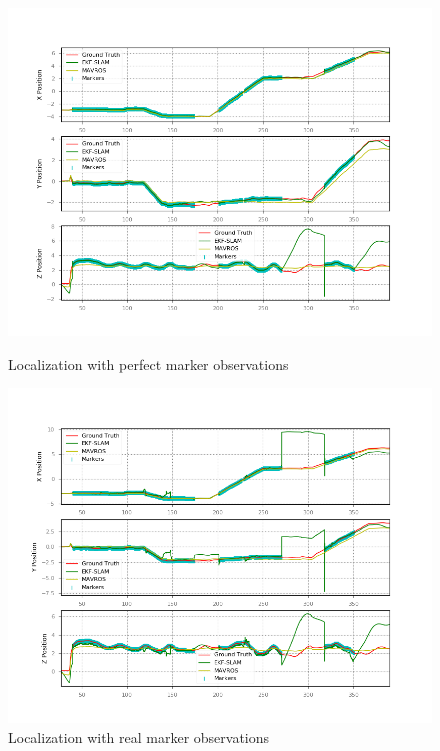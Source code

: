 \begin{figure}
    \centering
    \includegraphics[width=\textwidth]{Images/fig21-fake-markers-wmap.png}
    \caption{Localization with perfect marker observations}
    \label{fig:chapter3:simulation:b:fake-markers-real-map}
    \centering
    \includegraphics[width=\textwidth]{Images/fig21-real-marker-wmap.png}
    \caption{Localization with real marker observations}
    \label{fig:chapter3:simulation:b:real-markers-real-map}
\end{figure}

